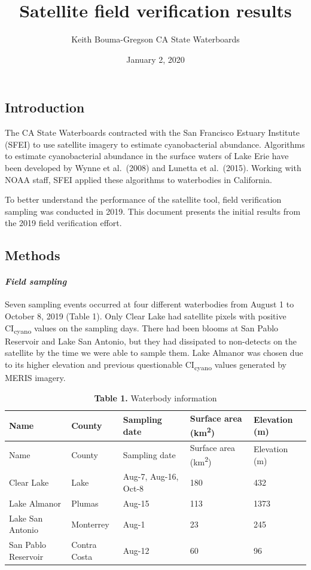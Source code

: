 \documentclass[
]{article}
\title{Satellite field verification results}
\author{Keith Bouma-Gregson \textbar{} CA State Waterboards}
\date{January 2, 2020}
\begin{document}
\maketitle

\hypertarget{introduction}{%
\subsection{\texorpdfstring{\textbf{Introduction}}{Introduction}}\label{introduction}}

The CA State Waterboards contracted with the San Francisco Estuary
Institute (SFEI) to use satellite imagery to estimate cyanobacterial
abundance. Algorithms to estimate cyanobacterial abundance in the
surface waters of Lake Erie have been developed by Wynne et al.~(2008)
and Lunetta et al.~(2015). Working with NOAA staff, SFEI applied these
algorithms to waterbodies in California.

To better understand the performance of the satellite tool, field
verification sampling was conducted in 2019. This document presents the
initial results from the 2019 field verification effort.

\hypertarget{methods}{%
\subsection{\texorpdfstring{\textbf{Methods}}{Methods}}\label{methods}}

\hypertarget{field-sampling}{%
\paragraph{\texorpdfstring{\emph{Field
sampling}}{Field sampling}}\label{field-sampling}}

Seven sampling events occurred at four different waterbodies from August
1 to October 8, 2019 (Table 1). Only Clear Lake had satellite pixels
with positive CI\textsubscript{cyano} values on the sampling days. There
had been blooms at San Pablo Reservoir and Lake San Antonio, but they
had dissipated to non-detects on the satellite by the time we were able
to sample them. Lake Almanor was chosen due to its higher elevation and
previous questionable CI\textsubscript{cyano} values generated by MERIS
imagery.

\begin{longtable}[]{@{}lllll@{}}
\caption{\textbf{Table 1.} Waterbody information}\tabularnewline
\toprule
Name & County & Sampling date & Surface area (km\textsuperscript{2}) &
Elevation (m)\tabularnewline
\midrule
\endfirsthead
\toprule
Name & County & Sampling date & Surface area (km\textsuperscript{2}) &
Elevation (m)\tabularnewline
\midrule
\endhead
Clear Lake & Lake & Aug-7, Aug-16, Oct-8 & 180 & 432\tabularnewline
Lake Almanor & Plumas & Aug-15 & 113 & 1373\tabularnewline
Lake San Antonio & Monterrey & Aug-1 & 23 & 245\tabularnewline
San Pablo Reservoir & Contra Costa & Aug-12 & 60 & 96\tabularnewline
\bottomrule
\end{longtable}
\end{document}
